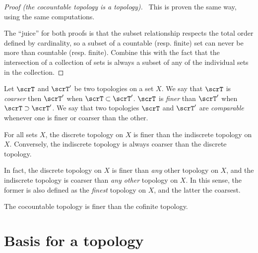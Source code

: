 \documentclass{article}
\begin{document}
\begin{proof}[Proof (the cocountable topology is a topology)] \
    This is proven the same way, using the same computations.

    The ``juice'' for both proofs is that the subset relationship respects the total order defined by cardinality, so a subset of a countable (resp. finite) set can never be more than countable (resp. finite).
    Combine this with the fact that the intersection of a collection of sets is always a subset of any of the individual sets in the collection.
\end{proof}

\begin{definition}
    Let $\scrT$ and $\scrT'$ be two topologies on a set $X$.
    We say that $\scrT$ is \textit{coarser} then $\scrT'$ when $\scrT \subset \scrT'$.
    $\scrT$ is \textit{finer} than $\scrT'$ when $\scrT \supset \scrT'$.
    We say that two topologies $\scrT$ and $\scrT'$ are \textit{comparable} whenever one is finer or coarser than the other.
\end{definition}

\begin{example}
    For all sets $X$, the discrete topology on $X$ is finer than the indiscrete topology on $X$.
    Conversely, the indiscrete topology is always coarser than the discrete topology.

    In fact, the discrete topology on $X$ is finer than \textit{any} other topology on $X$, and the indiscrete topology is coarser than \textit{any other} topology on $X$.
    In this sense, the former is also defined as the \textit{finest} topology on $X$, and the latter the coarsest.
\end{example}

\begin{example}
    The cocountable topology is finer than the cofinite topology.
\end{example}

\section{Basis for a topology}
\end{document}
